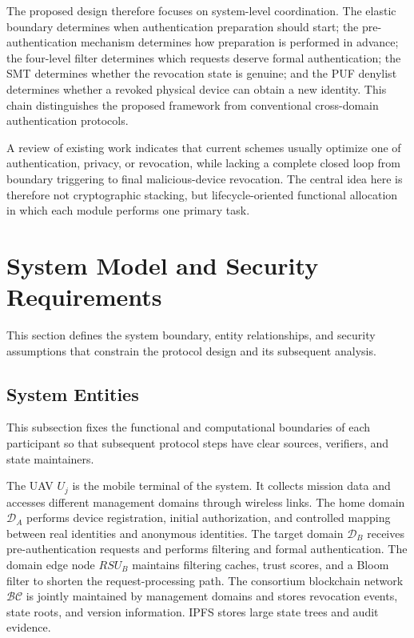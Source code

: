 \documentclass[lettersize,journal]{IEEEtran}
\begin{document}
	The proposed design therefore focuses on system-level coordination. The elastic boundary determines when authentication preparation should start; the pre-authentication mechanism determines how preparation is performed in advance; the four-level filter determines which requests deserve formal authentication; the SMT determines whether the revocation state is genuine; and the PUF denylist determines whether a revoked physical device can obtain a new identity. This chain distinguishes the proposed framework from conventional cross-domain authentication protocols.
	
	A review of existing work indicates that current schemes usually optimize one of authentication, privacy, or revocation, while lacking a complete closed loop from boundary triggering to final malicious-device revocation. The central idea here is therefore not cryptographic stacking, but lifecycle-oriented functional allocation in which each module performs one primary task.
	
	\section{System Model and Security Requirements}
	This section defines the system boundary, entity relationships, and security assumptions that constrain the protocol design and its subsequent analysis.
	
	
	\subsection{System Entities}
	This subsection fixes the functional and computational boundaries of each participant so that subsequent protocol steps have clear sources, verifiers, and state maintainers.
	
	
	The UAV $U_j$ is the mobile terminal of the system. It collects mission data and accesses different management domains through wireless links. The home domain $\mathcal{D}_A$ performs device registration, initial authorization, and controlled mapping between real identities and anonymous identities. The target domain $\mathcal{D}_B$ receives pre-authentication requests and performs filtering and formal authentication. The domain edge node $RSU_B$ maintains filtering caches, trust scores, and a Bloom filter to shorten the request-processing path. The consortium blockchain network $\mathcal{BC}$ is jointly maintained by management domains and stores revocation events, state roots, and version information. IPFS stores large state trees and audit evidence.
	
\end{document}

